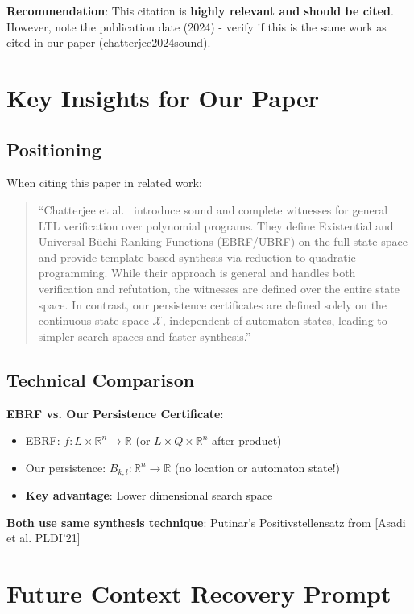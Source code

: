 \documentclass{article}
\begin{document}
\begin{enumerate}
\textbf{Recommendation}: This citation is \textbf{highly relevant and should be cited}. However, note the publication date (2024) - verify if this is the same work as cited in our paper (chatterjee2024sound).

\section{Key Insights for Our Paper}

\subsection{Positioning}

When citing this paper in related work:

\begin{quote}
``Chatterjee et al.~\cite{chatterjee2024sound} introduce sound and complete witnesses for general LTL verification over polynomial programs. They define Existential and Universal Büchi Ranking Functions (EBRF/UBRF) on the full state space and provide template-based synthesis via reduction to quadratic programming. While their approach is general and handles both verification and refutation, the witnesses are defined over the entire state space. In contrast, our persistence certificates are defined solely on the continuous state space $\mathcal{X}$, independent of automaton states, leading to simpler search spaces and faster synthesis.''
\end{quote}

\subsection{Technical Comparison}

\textbf{EBRF vs. Our Persistence Certificate}:
\begin{itemize}
    \item EBRF: $f: L \times \mathbb{R}^n \rightarrow \mathbb{R}$ (or $L \times Q \times \mathbb{R}^n$ after product)
    \item Our persistence: $B_{k,l}: \mathbb{R}^n \rightarrow \mathbb{R}$ (no location or automaton state!)
    \item \textbf{Key advantage}: Lower dimensional search space
\end{itemize}

\textbf{Both use same synthesis technique}: Putinar's Positivstellensatz from [Asadi et al. PLDI'21]

\section{Future Context Recovery Prompt}


\end{enumerate}
\end{document}
